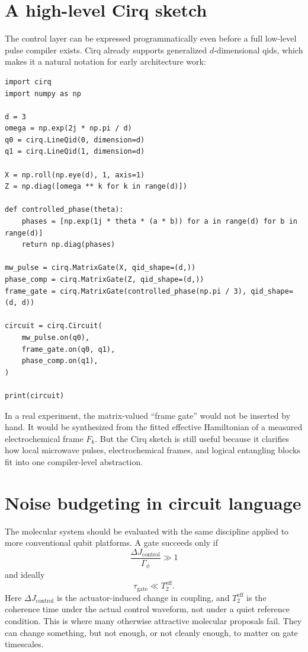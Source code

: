 \documentclass[11pt]{report}
\theoremstyle{definition}
\begin{document}
\section{A high-level Cirq sketch}
The control layer can be expressed programmatically even before a full low-level pulse compiler exists. Cirq already supports generalized $d$-dimensional qids, which makes it a natural notation for early architecture work:

\begin{lstlisting}[style=cirqstyle,caption={High-level Cirq sketch for a local qutrit module whose entangling block corresponds to a calibrated electrochemical frame.}]
import cirq
import numpy as np

d = 3
omega = np.exp(2j * np.pi / d)
q0 = cirq.LineQid(0, dimension=d)
q1 = cirq.LineQid(1, dimension=d)

X = np.roll(np.eye(d), 1, axis=1)
Z = np.diag([omega ** k for k in range(d)])

def controlled_phase(theta):
    phases = [np.exp(1j * theta * (a * b)) for a in range(d) for b in range(d)]
    return np.diag(phases)

mw_pulse = cirq.MatrixGate(X, qid_shape=(d,))
phase_comp = cirq.MatrixGate(Z, qid_shape=(d,))
frame_gate = cirq.MatrixGate(controlled_phase(np.pi / 3), qid_shape=(d, d))

circuit = cirq.Circuit(
    mw_pulse.on(q0),
    frame_gate.on(q0, q1),
    phase_comp.on(q1),
)

print(circuit)
\end{lstlisting}

In a real experiment, the matrix-valued ``frame gate'' would not be inserted by hand. It would be synthesized from the fitted effective Hamiltonian of a measured electrochemical frame $F_k$. But the Cirq sketch is still useful because it clarifies how local microwave pulses, electrochemical frames, and logical entangling blocks fit into one compiler-level abstraction.

\section{Noise budgeting in circuit language}
The molecular system should be evaluated with the same discipline applied to more conventional qubit platforms. A gate succeeds only if
\[
\frac{\Delta J_{\mathrm{control}}}{\Gamma_\phi} \gg 1
\]
and ideally
\[
\tau_{\mathrm{gate}} \ll T_2^{\mathrm{eff}}.
\]
Here $\Delta J_{\mathrm{control}}$ is the actuator-induced change in coupling, and $T_2^{\mathrm{eff}}$ is the coherence time under the actual control waveform, not under a quiet reference condition. This is where many otherwise attractive molecular proposals fail. They can change something, but not enough, or not cleanly enough, to matter on gate timescales.
\end{document}
